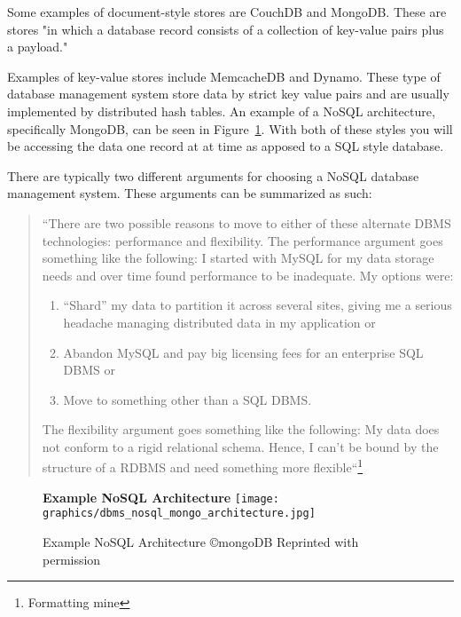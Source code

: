 \documentclass[letterpaper, 11pt]{article}
\begin{document}
Some examples of document-style stores are CouchDB and MongoDB. These are stores
"in which a database record consists of a collection of key-value pairs plus a payload."
\cite{stonebraker2010sql}
\par\vspace{\baselineskip}
Examples of key-value stores include MemcacheDB and Dynamo. These type of database
management system store data by strict key value pairs and are usually implemented by
distributed hash tables. An example of a NoSQL architecture, specifically MongoDB,
can be seen in Figure~\ref{fig:nosqlDBMS_structure}. With both of these styles you 
will be accessing the data one record at at time as apposed to a SQL style database.
\par\vspace{\baselineskip}
There are typically two different arguments for choosing a NoSQL database management
system. These arguments can be summarized as such:
\begin{quote}
``There are two possible reasons
to move to either of these alternate
DBMS technologies: performance and
flexibility.
The performance argument goes
something like the following: I started
with MySQL for my data storage needs
and over time found performance to be
inadequate. My options were:

\begin{enumerate}
  \item “Shard” my data to partition it
across several sites, giving me a serious
headache managing distributed data
in my application or
  \item Abandon MySQL and pay big licensing
fees for an enterprise SQL
DBMS or
\item Move to something other
than a SQL DBMS.
\end{enumerate}

The flexibility argument goes something
like the following: My data does
not conform to a rigid relational schema.
Hence, I can’t be bound by the
structure of a RDBMS and need something
more flexible``\cite{stonebraker2010sql}\footnote{Formatting mine}
\end{quote} 
\par\vspace{\baselineskip}

\begin{figure}[H]
  \centering
  \textbf{Example NoSQL Architecture}
  \texttt{[image: graphics/dbms\_nosql\_mongo\_architecture.jpg]}
  \caption{Example NoSQL Architecture \copyright mongoDB   \citep{mongodb_architecture} Reprinted with permission}
  \label{fig:nosqlDBMS_structure}
\end{figure}
\newpage
\end{document}

